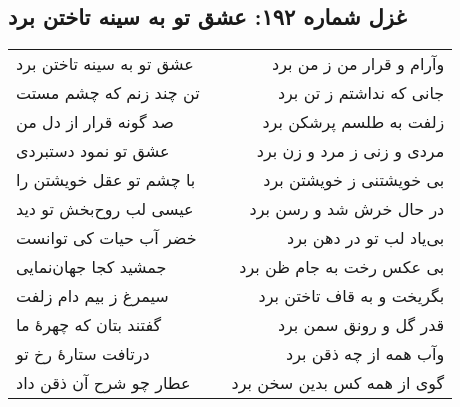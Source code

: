 \begin{center}
\section*{غزل شماره ۱۹۲: عشق تو به سینه تاختن برد}
\label{sec:192}
\begin{longtable}{l p{0.5cm} r}
عشق تو به سینه تاختن برد
&&
وآرام و قرار من ز من برد
\\
تن چند زنم که چشم مستت
&&
جانی که نداشتم ز تن برد
\\
صد گونه قرار از دل من
&&
زلفت به طلسم پرشکن برد
\\
عشق تو نمود دستبردی
&&
مردی و زنی ز مرد و زن برد
\\
با چشم تو عقل خویشتن را
&&
بی خویشتنی ز خویشتن برد
\\
عیسی لب روح‌بخش تو دید
&&
در حال خرش شد و رسن برد
\\
خضر آب حیات کی توانست
&&
بی‌یاد لب تو در دهن برد
\\
جمشید کجا جهان‌نمایی
&&
بی عکس رخت به جام ظن برد
\\
سیمرغ ز بیم دام زلفت
&&
بگریخت و به قاف تاختن برد
\\
گفتند بتان که چهرهٔ ما
&&
قدر گل و رونق سمن برد
\\
درتافت ستارهٔ رخ تو
&&
وآب همه از چه ذقن برد
\\
عطار چو شرح آن ذقن داد
&&
گوی از همه کس بدین سخن برد
\\
\end{longtable}
\end{center}
